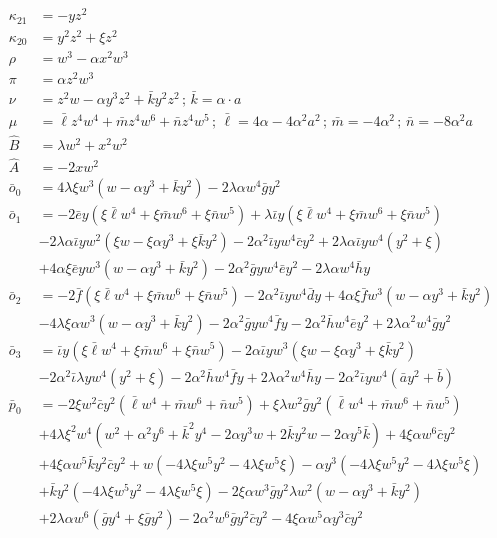 \documentclass[12pt]{article}
\numberwithin{table}{section}
\begin{document}
\begin{align}
\kappa_{21} &= -yz^2 \\
\kappa_{20} &= y^2 z^2 + \xi z^2\\
\rho &= w^3 - \alpha x^2 w^3\\
\pi &= \alpha z^2w^3\\
\nu &= z^2 w - \alpha y^3 z^2 + \bar k y^2 z^2\,;\,\bar k = \alpha \cdot a\\
\mu &= \bar \ell z^4 w^4 + \bar m z^4 w^6 + \bar n z^4 w^5 \,;\,\bar \ell = 4\alpha   -4\alpha^2 a^2 \,;\,\bar m = -4\alpha^2 \,;\,\bar n = - 8\alpha^2 a \\
\hat B &= \lambda w^2 + x^2 w^2\\
\hat A &= -2xw^2 \\
\bar o_0 &= 4\lambda \xi w^3(  w - \alpha y^3  + \bar k y^2 ) -2 \lambda \alpha w^4 \bar g y^2 \\ 
\bar o_1 &= -2\bar e y (\xi\bar \ell w^4 + \xi\bar m w^6 + \xi\bar n w^5)
+ \lambda \bar\iota y(\xi\bar \ell  w^4 + \xi\bar m  w^6 + \xi\bar n  w^5)\nonumber\\
&-2\lambda\alpha \bar \iota yw^2 ( \xi  w - \xi \alpha y^3  + \xi \bar k y^2 ) - 2\alpha^2 \bar \iota y w^4 \bar c y^2 +2\lambda\alpha \bar \iota y  w^4 (y^2  + \xi )\nonumber\\
&+4\alpha\xi \bar e yw^3(  w - \alpha y^3  + \bar k y^2 ) -2\alpha^2 \bar g y w^4\bar e y^2 -2 \lambda \alpha w^4 \bar h y \\
\bar o_2 &= -2 \bar f  (\xi\bar \ell  w^4 + \xi\bar m  w^6 + \xi\bar n  w^5)- 2\alpha^2 \bar \iota y w^4 \bar d y +4\alpha\xi \bar f  w^3(  w - \alpha y^3  + \bar k y^2 )  \nonumber\\
&- 4\lambda \xi \alpha  w^3(  w - \alpha y^3  + \bar k y^2) -2\alpha^2 \bar g y w^4 \bar f  y -2\alpha^2 \bar h w^4\bar e y^2 + 2 \lambda \alpha^2 w^4 \bar g y^2 \\
\bar o_3 &= \bar\iota y(\xi\bar \ell  w^4 + \xi\bar m  w^6 + \xi\bar n  w^5)-2\alpha \bar \iota y w^3 ( \xi  w - \xi \alpha y^3  + \xi \bar k y^2 )  \nonumber\\
&- 2\alpha^2 \bar \iota \lambda y  w^4 (y^2  + \xi ) 
-2\alpha^2 \bar h w^4 \bar f  y
+ 2 \lambda \alpha^2 w^4 \bar h  y- 2\alpha^2 \bar \iota y w^4  (\bar a y^2 + \bar b )\\
\bar p_0 &=- 2\xi w^2\bar c y^2 (\bar \ell  w^4 + \bar m  w^6 + \bar n  w^5) + \xi \lambda w^2\bar g y^2 (\bar \ell  w^4 + \bar m  w^6 + \bar n  w^5)\nonumber\\
&+4\lambda\xi^2 w^4 (  w^2 + \alpha^2 y^6  + \bar k^2 y^4  - 2  \alpha y^3  w + 2 \bar k y^2 w - 2 \alpha y^5  \bar k) +  4 \xi\alpha w^6  \bar c y^2  \nonumber\\
&+ 4 \xi\alpha w^5\bar k y^2 \bar c y^2 +  w (-4 \lambda \xi w^5 y^2  -4 \lambda \xi w^5 \xi) - \alpha y^3  (-4 \lambda \xi w^5 y^2  -4 \lambda \xi w^5 \xi) \nonumber\\
&+ \bar k y^2  (-4 \lambda \xi w^5 y^2  -4 \lambda \xi w^5 \xi) -2 \xi\alpha w^3 \bar g y^2\lambda w^2 (  w - \alpha y^3  + \bar k y^2 )   \nonumber\\
&+ 2 \lambda \alpha w^6 (\bar g y^4 + \xi \bar g y^2) -2 \alpha^2 w^6\bar g y^2 \bar c y^2 - 4 \xi\alpha w^5\alpha y^3 \bar c y^2
\end{align}
\end{document}
